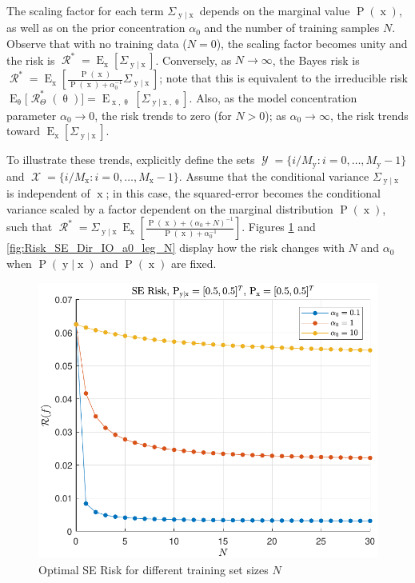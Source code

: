 \documentclass[12pt]{report}
\DeclareMathOperator{\xrm}{\mathrm{x}}
\DeclareMathOperator{\yrm}{\mathrm{y}}
\DeclareMathOperator{\Prm}{\mathrm{P}}
\DeclareMathOperator{\Erm}{\mathrm{E}}
\DeclareMathOperator{\Xcal}{\mathcal{X}}
\DeclareMathOperator{\Ycal}{\mathcal{Y}}
\DeclareMathOperator{\Rcal}{\mathcal{R}}
\begin{document}
The scaling factor for each term $\Sigma_{\yrm | \xrm}$ depends on the marginal value $\Prm(\xrm)$, as well as on the prior concentration $\alpha_0$ and the number of training samples $N$. Observe that with no training data ($N = 0$), the scaling factor becomes unity and the risk is $\Rcal^* = \Erm_{\xrm} \left[ \Sigma_{\yrm | \xrm} \right]$. Conversely, as $N \to \infty$, the Bayes risk is $\Rcal^* = \Erm_{\xrm} \left[ \frac{\Prm(\xrm)}{\Prm(\xrm) + \alpha_0^{-1}} \Sigma_{\yrm | \xrm} \right]$; note that this is equivalent to the irreducible risk $\Erm_{\uptheta}\big[\Rcal_{\Theta}^*(\uptheta)\big] = \Erm_{\xrm,\uptheta} \left[ \Sigma_{\yrm | \xrm,\uptheta} \right]$. Also, as the model concentration parameter $\alpha_0 \to 0$, the risk trends to zero (for $N > 0$); as $\alpha_0 \to \infty$, the risk trends toward $\Erm_{\xrm} \left[ \Sigma_{\yrm | \xrm} \right]$.

To illustrate these trends, explicitly define the sets $\Ycal = \{ i/M_{\yrm} : i = 0,\ldots,M_{\yrm}-1 \}$ and $\Xcal = \{ i/M_{\xrm} : i = 0,\ldots,M_{\xrm}-1 \}$. Assume that the conditional variance $\Sigma_{\yrm | \xrm}$ is independent of $\xrm$; in this case, the squared-error becomes the conditional variance scaled by a factor dependent on the marginal distribution $\Prm(\xrm)$, such that $\Rcal^* = \Sigma_{\yrm | \xrm} \Erm_{\xrm} \left[ \frac{\Prm(\xrm) + (\alpha_0+N)^{-1}}{\Prm(\xrm) + \alpha_0^{-1}} \right]$.  Figures \ref{fig:Risk_SE_Dir_IO_N_leg_a0} and \ref{fig:Risk_SE_Dir_IO_a0_leg_N} display how the risk changes with $N$ and $\alpha_0$ when $\Prm(\yrm|\xrm)$ and $\Prm(\xrm)$ are fixed.

\begin{figure}
\centering
\includegraphics[width=0.8\linewidth]{Risk_SE_Dir_IO_N_leg_a0.pdf}
\caption{Optimal SE Risk for different training set sizes $N$}
\label{fig:Risk_SE_Dir_IO_N_leg_a0}
\end{figure}
\end{document}

